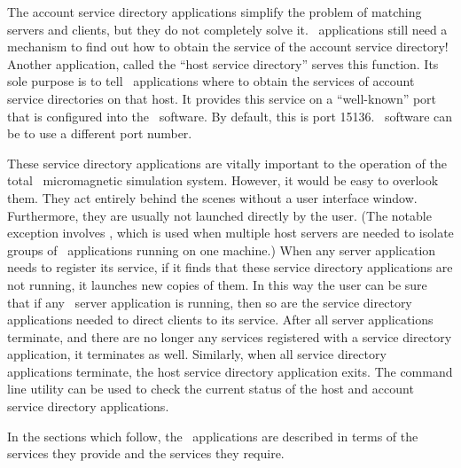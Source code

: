 The account service directory applications simplify the problem
of matching servers and clients, but they do not completely solve
it.  \OOMMF\ applications still need a mechanism to find out how
to obtain the service of the account service directory!
Another application, called the ``host service directory'' serves
this function.  Its sole purpose is to tell \OOMMF\ applications
where to obtain the services of account service directories on that
host. It provides this service on a ``well-known'' port that is
configured into the \OOMMF\ software.  By default, this is port 15136.
\OOMMF\ software can be 
to use a different port number.

These service directory applications are vitally important to the operation
of the total \OOMMF\ micromagnetic simulation system.  However, it would be
easy to overlook them.  They act entirely behind the scenes without a user
interface window.  Furthermore, they are usually not launched directly by
the user.  (The notable exception involves
,
which is used when multiple host servers are needed to isolate groups of
\OOMMF\ applications running on one machine.) When any server application
needs to register its service, if it finds that these service directory
applications are not running, it launches new copies of them.  In this way
the user can be sure that if any \OOMMF\ server application is running, then
so are the service directory applications needed to direct clients to its
service.  After all server applications terminate, and there are no longer
any services registered with a service directory application, it terminates
as well.  Similarly, when all service directory applications terminate, the
host service directory application exits. The command line
utility
can be used to check the current status of the host and account service
directory applications.

In the sections which follow, the \OOMMF\ applications are
described in terms of the services they provide and the services
they require.  

